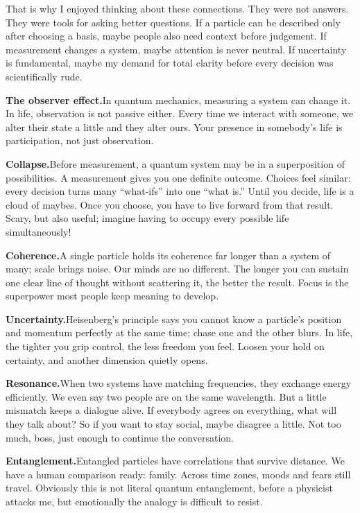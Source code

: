 \documentclass[11pt,twoside,openany]{book}
\begin{document}
That is why I enjoyed thinking about these connections. They were not answers.
They were tools for asking better questions. If a particle can be described
only after choosing a basis, maybe people also need context before judgement.
If measurement changes a system, maybe attention is never neutral. If
uncertainty is fundamental, maybe my demand for total clarity before every
decision was scientifically rude.

\textbf{\textsf{The observer effect.}}\quad In quantum mechanics, measuring a
system can change it. In life, observation is not passive either. Every time
we interact with someone, we alter their state a little and they alter ours.
Your presence in somebody's life is participation, not just observation.

\textbf{\textsf{Collapse.}}\quad Before measurement, a quantum system may be
in a superposition of possibilities. A measurement gives you one definite
outcome. Choices feel similar: every decision turns many ``what-ifs'' into one
``what is.'' Until you decide, life is a cloud of maybes. Once you choose, you
have to live forward from that result. Scary, but also useful; imagine having
to occupy every possible life simultaneously!

\textbf{\textsf{Coherence.}}\quad A single particle holds its coherence far
longer than a system of many; scale brings noise. Our minds are no different.
The longer you can sustain one clear line of thought without scattering it,
the better the result. Focus is the superpower most people keep meaning to
develop.

\textbf{\textsf{Uncertainty.}}\quad Heisenberg's principle says you cannot
know a particle's position and momentum perfectly at the same time; chase one
and the other blurs. In life, the tighter you grip control, the less freedom
you feel. Loosen your hold on certainty, and another dimension quietly opens.

\textbf{\textsf{Resonance.}}\quad When two systems have matching frequencies,
they exchange energy efficiently. We even say two people are on the same
wavelength. But a little mismatch keeps a dialogue alive. If everybody agrees
on everything, what will they talk about? So if you want to stay social, maybe
disagree a little. Not too much, boss, just enough to continue the
conversation.

\textbf{\textsf{Entanglement.}}\quad Entangled particles have correlations
that survive distance. We have a human comparison ready: family. Across time
zones, moods and fears still travel. Obviously this is not literal quantum
entanglement, before a physicist attacks me, but emotionally the analogy is
difficult to resist.
\end{document}
